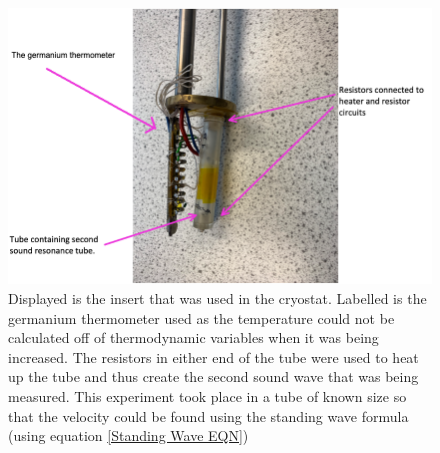 \documentclass[a4paper,11pt]{article}
\begin{document}
\begin{figure}[hbt!]
    \centering
    \includegraphics[scale=0.3]{Picture 2.png}
    \caption{Displayed is the insert that was used in the cryostat. Labelled is the germanium thermometer used as the temperature could not be calculated off of thermodynamic variables when it was being increased. The resistors in either end of the tube were used to heat up the tube and thus create the second sound wave that was being measured. This experiment took place in a tube of known size so that the velocity could be found using the standing wave formula (using equation \ref{Standing Wave EQN})}
    \label{fig: Cryostat Insert}
\end{figure}
   \\
   
   
\end{document}

